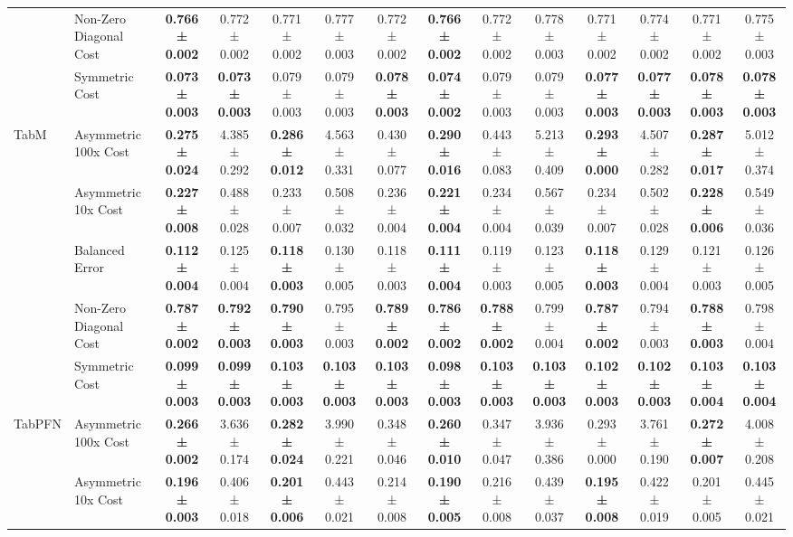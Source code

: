\begin{table}[H]
{\begin{tabular}{llcccccccccccc}
 & Non-Zero Diagonal Cost & \textbf{0.766 ± 0.002} & 0.772 ± 0.002 & 0.771 ± 0.002 & 0.777 ± 0.003 & 0.772 ± 0.002 & \textbf{0.766 ± 0.002} & 0.772 ± 0.002 & 0.778 ± 0.003 & 0.771 ± 0.002 & 0.774 ± 0.002 & 0.771 ± 0.002 & 0.775 ± 0.003 \\
 & Symmetric Cost & \textbf{0.073 ± 0.003} & \textbf{0.073 ± 0.003} & 0.079 ± 0.003 & 0.079 ± 0.003 & \textbf{0.078 ± 0.003} & \textbf{0.074 ± 0.002} & 0.079 ± 0.003 & 0.079 ± 0.003 & \textbf{0.077 ± 0.003} & \textbf{0.077 ± 0.003} & \textbf{0.078 ± 0.003} & \textbf{0.078 ± 0.003} \\
\cline{1-14}
\multirow[t]{5}{*}{TabM} & Asymmetric 100x Cost & \textbf{0.275 ± 0.024} & 4.385 ± 0.292 & \textbf{0.286 ± 0.012} & 4.563 ± 0.331 & 0.430 ± 0.077 & \textbf{0.290 ± 0.016} & 0.443 ± 0.083 & 5.213 ± 0.409 & \textbf{0.293 ± 0.000} & 4.507 ± 0.282 & \textbf{0.287 ± 0.017} & 5.012 ± 0.374 \\
 & Asymmetric 10x Cost & \textbf{0.227 ± 0.008} & 0.488 ± 0.028 & 0.233 ± 0.007 & 0.508 ± 0.032 & 0.236 ± 0.004 & \textbf{0.221 ± 0.004} & 0.234 ± 0.004 & 0.567 ± 0.039 & 0.234 ± 0.007 & 0.502 ± 0.028 & \textbf{0.228 ± 0.006} & 0.549 ± 0.036 \\
 & Balanced Error & \textbf{0.112 ± 0.004} & 0.125 ± 0.004 & \textbf{0.118 ± 0.003} & 0.130 ± 0.005 & 0.118 ± 0.003 & \textbf{0.111 ± 0.004} & 0.119 ± 0.003 & 0.123 ± 0.005 & \textbf{0.118 ± 0.003} & 0.129 ± 0.004 & 0.121 ± 0.003 & 0.126 ± 0.005 \\
 & Non-Zero Diagonal Cost & \textbf{0.787 ± 0.002} & \textbf{0.792 ± 0.003} & \textbf{0.790 ± 0.003} & 0.795 ± 0.003 & \textbf{0.789 ± 0.002} & \textbf{0.786 ± 0.002} & \textbf{0.788 ± 0.002} & 0.799 ± 0.004 & \textbf{0.787 ± 0.002} & 0.794 ± 0.003 & \textbf{0.788 ± 0.003} & 0.798 ± 0.004 \\
 & Symmetric Cost & \textbf{0.099 ± 0.003} & \textbf{0.099 ± 0.003} & \textbf{0.103 ± 0.003} & \textbf{0.103 ± 0.003} & \textbf{0.103 ± 0.003} & \textbf{0.098 ± 0.003} & \textbf{0.103 ± 0.003} & \textbf{0.103 ± 0.003} & \textbf{0.102 ± 0.003} & \textbf{0.102 ± 0.003} & \textbf{0.103 ± 0.004} & \textbf{0.103 ± 0.004} \\
\cline{1-14}
\multirow[t]{5}{*}{TabPFN} & Asymmetric 100x Cost & \textbf{0.266 ± 0.002} & 3.636 ± 0.174 & \textbf{0.282 ± 0.024} & 3.990 ± 0.221 & 0.348 ± 0.046 & \textbf{0.260 ± 0.010} & 0.347 ± 0.047 & 3.936 ± 0.386 & 0.293 ± 0.000 & 3.761 ± 0.190 & \textbf{0.272 ± 0.007} & 4.008 ± 0.208 \\
 & Asymmetric 10x Cost & \textbf{0.196 ± 0.003} & 0.406 ± 0.018 & \textbf{0.201 ± 0.006} & 0.443 ± 0.021 & 0.214 ± 0.008 & \textbf{0.190 ± 0.005} & 0.216 ± 0.008 & 0.439 ± 0.037 & \textbf{0.195 ± 0.008} & 0.422 ± 0.019 & 0.201 ± 0.005 & 0.445 ± 0.021 \\

\end{tabular}}
\end{table}
